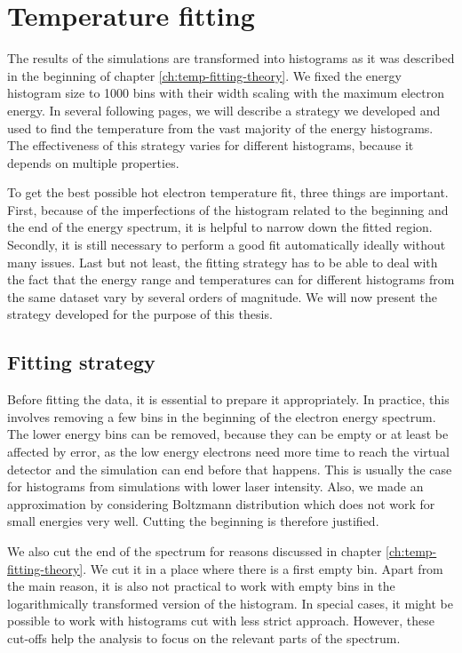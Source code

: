 \section{Temperature fitting}
The results of the simulations are transformed into histograms as it was described in the beginning of chapter \ref{ch:temp-fitting-theory}. We fixed the energy histogram size to 1000 bins with their width scaling with the maximum electron energy. In several following pages, we will describe a strategy we developed and used to find the temperature from the vast majority of the energy histograms. The effectiveness of this strategy varies for different histograms, because it depends on multiple properties.

To get the best possible hot electron temperature fit, three things are important. First, because of the imperfections of the histogram related to the beginning and the end of the energy spectrum, it is helpful to narrow down the fitted region. Secondly, it is still necessary to perform a good fit automatically ideally without many issues. Last but not least, the fitting strategy has to be able to deal with the fact that the energy range and temperatures can for different histograms from the same dataset vary by several orders of magnitude. We will now present the strategy developed for the purpose of this thesis.


\subsection*{Fitting strategy}
Before fitting the data, it is essential to prepare it appropriately. In practice, this involves removing a few bins in the beginning of the electron energy spectrum. The lower energy bins can be removed, because  they can be empty or at least be affected by error, as the low energy electrons need more time to reach the virtual detector and the simulation can end before that happens. This is usually the case for histograms from simulations with lower laser intensity. Also, we made an approximation by considering Boltzmann distribution which does not work for small energies very well. Cutting the beginning is therefore justified. 

We also cut the end of the spectrum for reasons discussed in chapter \ref{ch:temp-fitting-theory}. We cut it in a place where there is a first empty bin. Apart from the main reason, it is also not practical to work with empty bins in the logarithmically transformed version of the histogram. In special cases, it might be possible to work with histograms cut with less strict approach. However, these cut-offs help the analysis to focus on the relevant parts of the spectrum.


